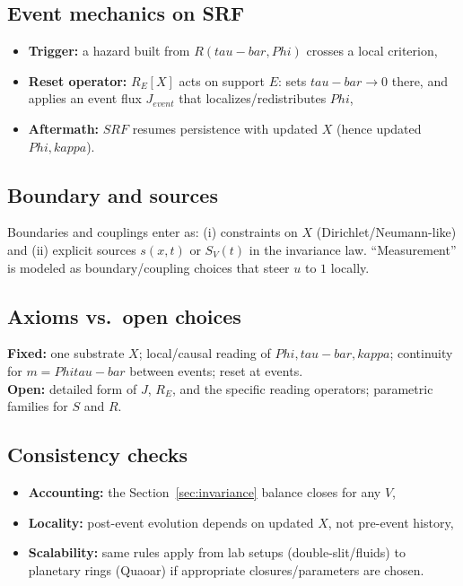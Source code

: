 \documentclass[12pt]{article}
\newcommand{\FoldDensity}{\Phi}
\newcommand{\FoldTime}{\bar{\tau}}
\newcommand{\Threshold}{\kappa}
\newcommand{\Survival}{S}
\newcommand{\Release}{R}
\newcommand{\SRF}{\mathcal{F}_{\mathrm{SR}}}
\def\FoldDensity{Phi}%
\def\FoldTime{tau-bar}%
\def\Threshold{kappa}%
\def\SRF{SRF}%
\def\Survival{S}%
\def\Release{R}%
\def\bar#1{#1}%
\def\mathcal#1{#1}%
\def\mathrm#1{#1}%
\begin{document}
\subsection{Event mechanics on SRF}
\begin{itemize}
  \item \textbf{Trigger:} a hazard built from $\Release(\FoldTime,\FoldDensity)$ crosses a local criterion,
  \item \textbf{Reset operator:} $\mathcal{R}_E[X]$ acts on support $E$: sets $\FoldTime\to 0$ there, and applies an event flux $J_{\mathrm{event}}$ that localizes/redistributes $\FoldDensity$,
  \item \textbf{Aftermath:} $\SRF$ resumes persistence with updated $X$ (hence updated $\FoldDensity,\Threshold$).
\end{itemize}

\subsection{Boundary and sources}
Boundaries and couplings enter as: (i) constraints on $X$ (Dirichlet/Neumann-like) and (ii) explicit sources $s(x,t)$ or $S_V(t)$ in the invariance law.
``Measurement'' is modeled as boundary/coupling choices that steer $u$ to $1$ locally.

\subsection{Axioms vs.\ open choices}
\textbf{Fixed:} one substrate $X$; local/causal reading of $\FoldDensity,\FoldTime,\Threshold$; continuity for $m=\FoldDensity\FoldTime$ between events; reset at events.\\
\textbf{Open:} detailed form of $J$, $\mathcal{R}_E$, and the specific reading operators; parametric families for $\Survival$ and $\Release$.

\subsection{Consistency checks}
\begin{itemize}
  \item \textbf{Accounting:} the Section~\ref{sec:invariance} balance closes for any $V$,
  \item \textbf{Locality:} post-event evolution depends on updated $X$, not pre-event history,
  \item \textbf{Scalability:} same rules apply from lab setups (double-slit/fluids) to planetary rings (Quaoar) if appropriate closures/parameters are chosen.
\end{itemize}
\end{document}
